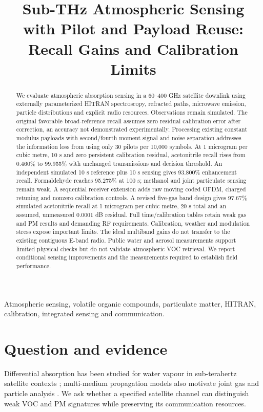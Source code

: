 \documentclass[conference]{IEEEtran}
\title{Sub-THz Atmospheric Sensing with Pilot and Payload Reuse: Recall Gains and Calibration Limits}
\author{\IEEEauthorblockN{Guillem Moreno Garcia}
\IEEEauthorblockA{Universitat Polit\`ecnica de Catalunya\\
Email: guillem.moreno.garcia@estudiantat.upc.edu}}
\begin{document}
\maketitle
\begin{abstract}
We evaluate atmospheric absorption sensing in a 60--400 GHz satellite downlink using externally parameterized HITRAN spectroscopy, refracted paths, microwave emission, particle distributions and explicit radio resources. Observations remain simulated. The original favorable broad-reference recall assumes zero residual calibration error after correction, an accuracy not demonstrated experimentally. Processing existing constant modulus payloads with second/fourth moment signal and noise separation addresses the information loss from using only 30 pilots per 10,000 symbols. At 1 microgram per cubic metre, 10 s and zero persistent calibration residual, acetonitrile recall rises from 0.460\% to 99.955\% with unchanged transmissions and decision threshold. An independent simulated 10 s reference plus 10 s sensing gives 93.800\% enhancement recall. Formaldehyde reaches 95.275\% at 100 s; methanol and joint particulate sensing remain weak. A sequential receiver extension adds raw moving coded OFDM, charged retuning and nonzero calibration controls. A revised five-gas band design gives 97.67\% simulated acetonitrile recall at 1 microgram per cubic metre, 20 s total and an assumed, unmeasured 0.0001 dB residual. Full time/calibration tables retain weak gas and PM results and demanding RF requirements. Calibration, weather and modulation stress expose important limits. The ideal multiband gains do not transfer to the existing contiguous E-band radio. Public water and aerosol measurements support limited physical checks but do not validate atmospheric VOC retrieval. We report conditional sensing improvements and the measurements required to establish field performance.
\end{abstract}
\begin{IEEEkeywords}
Atmospheric sensing, volatile organic compounds, particulate matter, HITRAN, calibration, integrated sensing and communication.
\end{IEEEkeywords}

\section{Question and evidence}
Differential absorption has been studied for water vapour in sub-terahertz satellite contexts \cite{aliaga}; multi-medium propagation models also motivate joint gas and particle analysis \cite{yang}. We ask whether a specified satellite channel can distinguish weak VOC and PM signatures while preserving its communication resources.
\end{document}
